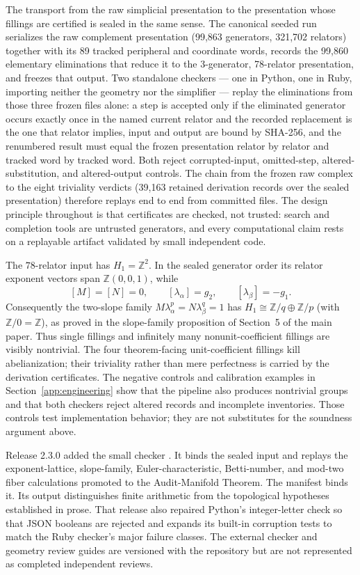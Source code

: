 \documentclass[11pt]{article}
\newcommand{\Z}{\mathbb{Z}}
\theoremstyle{definition}
\begin{document}
The transport from the raw simplicial presentation to the presentation
whose fillings are certified is sealed in the same sense. The canonical
seeded run serializes the raw complement presentation (99,863 generators,
321,702 relators) together with its 89 tracked peripheral and coordinate
words, records the 99,860 elementary eliminations that reduce it to the
3-generator, 78-relator presentation, and freezes that output. Two
standalone checkers --- one in Python, one in Ruby, importing neither the
geometry nor the simplifier --- replay the eliminations from those three
frozen files alone: a step is accepted only if the eliminated generator
occurs exactly once in the named current relator and the recorded
replacement is the one that relator implies, input and output are bound by
SHA-256, and the renumbered result must equal the frozen presentation
relator by relator and tracked word by tracked word. Both reject
corrupted-input, omitted-step, altered-substitution, and altered-output
controls. The chain from the frozen raw complex to the eight triviality
verdicts (39,163 retained derivation records over the sealed presentation)
therefore replays end to end from committed files. The design principle throughout is that certificates are checked, not
trusted: search and completion tools are untrusted generators, and every
computational claim rests on a replayable artifact validated by small
independent code.

The $78$-relator input has $H_1=\Z^2$.  In the sealed generator order its
relator exponent vectors span $\Z(0,0,1)$, while
\[
 [M]=[N]=0,\qquad [\lambda_\alpha]=g_2,\qquad
 [\lambda_\beta]=-g_1.
\]
Consequently the two-slope family
$M\lambda_\alpha^p=N\lambda_\beta^q=1$ has
$H_1\cong\Z/q\oplus\Z/p$ (with $\Z/0=\Z$), as proved in the
slope-family proposition of Section~5 of the main paper.  Thus single
fillings and infinitely many nonunit-coefficient fillings are visibly
nontrivial.  The four theorem-facing unit-coefficient fillings kill
abelianization; their triviality rather than mere perfectness is carried by
the derivation certificates.  The negative controls and calibration examples in
Section~\ref{app:engineering} show that the pipeline also produces
nontrivial groups and that both checkers reject altered records and incomplete
inventories.  Those controls test implementation behavior; they are not
substitutes for the soundness argument above.

Release 2.3.0 added the small checker
.  It binds the
sealed input and replays the exponent-lattice, slope-family,
Euler-characteristic, Betti-number, and mod-two fiber calculations promoted
to the Audit-Manifold Theorem.  The manifest binds it.  Its output
distinguishes finite arithmetic from the topological hypotheses established
in prose.  That release also repaired Python's integer-letter check so
that JSON booleans are rejected and expands its built-in corruption tests to
match the Ruby checker's major failure classes.  The external checker and geometry
review guides are versioned with the repository but are not represented as
completed independent reviews.
\end{document}
